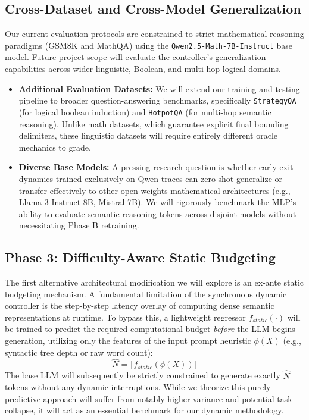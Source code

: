 \documentclass[11pt]{article}
\begin{document}
\subsection{Cross-Dataset and Cross-Model Generalization}
Our current evaluation protocols are constrained to strict mathematical reasoning paradigms (GSM8K and MathQA) using the \texttt{Qwen2.5-Math-7B-Instruct} base model. Future project scope will evaluate the controller's generalization capabilities across wider linguistic, Boolean, and multi-hop logical domains.
\begin{itemize}[leftmargin=*]
    \item \textbf{Additional Evaluation Datasets:} We will extend our training and testing pipeline to broader question-answering benchmarks, specifically \texttt{StrategyQA} (for logical boolean induction) and \texttt{HotpotQA} (for multi-hop semantic reasoning). Unlike math datasets, which guarantee explicit final bounding delimiters, these linguistic datasets will require entirely different oracle mechanics to grade.
    \item \textbf{Diverse Base Models:} A pressing research question is whether early-exit dynamics trained exclusively on Qwen traces can zero-shot generalize or transfer effectively to other open-weights mathematical architectures (e.g., Llama-3-Instruct-8B, Mistral-7B). We will rigorously benchmark the MLP's ability to evaluate semantic reasoning tokens across disjoint models without necessitating Phase B retraining.
\end{itemize}

\subsection{Phase 3: Difficulty-Aware Static Budgeting}
The first alternative architectural modification we will explore is an ex-ante static budgeting mechanism. A fundamental limitation of the synchronous dynamic controller is the step-by-step latency overlay of computing dense semantic representations at runtime. To bypass this, a lightweight regressor $f_{static}(\cdot)$ will be trained to predict the required computational budget \textit{before} the LLM begins generation, utilizing only the features of the input prompt heuristic $\phi(X)$ (e.g., syntactic tree depth or raw word count):
\begin{equation}
    \hat{N} = \lfloor f_{static}(\phi(X)) \rceil
\end{equation}
The base LLM will subsequently be strictly constrained to generate exactly $\hat{N}$ tokens without any dynamic interruptions. While we theorize this purely predictive approach will suffer from notably higher variance and potential task collapse, it will act as an essential benchmark for our dynamic methodology.
\end{document}
